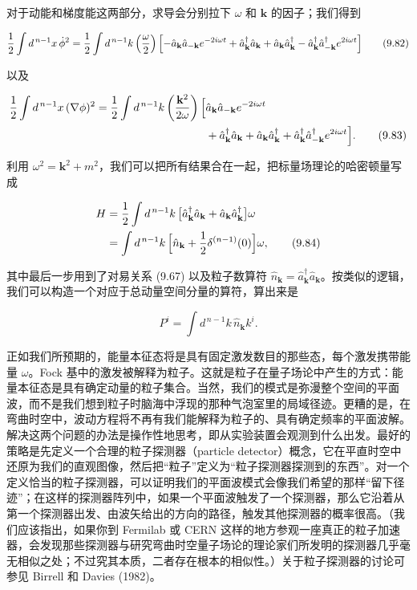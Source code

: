 对于动能和梯度能这两部分，求导会分别拉下 $\omega$ 和 $\mathbf{k}$ 的因子；我们得到

\begin{equation*}
\frac{1}{2}\int d^{\,n-1}x\,\dot{\phi}^2 = \frac{1}{2}\int d^{\,n-1}k\left(\frac{\omega}{2}\right)\Bigl[-\hat{a}_{\mathbf{k}}\hat{a}_{-\mathbf{k}}e^{-2i\omega t} + \hat{a}^{\dagger}_{\mathbf{k}}\hat{a}_{\mathbf{k}} + \hat{a}_{\mathbf{k}}\hat{a}^{\dagger}_{\mathbf{k}} - \hat{a}^{\dagger}_{\mathbf{k}}\hat{a}^{\dagger}_{-\mathbf{k}}e^{2i\omega t}\Bigr]
\tag{9.82}
\end{equation*}

以及

\begin{align*}
\frac{1}{2}\int d^{\,n-1}x\,(\nabla\phi)^2 = \frac{1}{2}\int d^{\,n-1}k\left(\frac{\mathbf{k}^2}{2\omega}\right)\Bigl[&\hat{a}_{\mathbf{k}}\hat{a}_{-\mathbf{k}}e^{-2i\omega t} \\
&+ \hat{a}^{\dagger}_{\mathbf{k}}\hat{a}_{\mathbf{k}} + \hat{a}_{\mathbf{k}}\hat{a}^{\dagger}_{\mathbf{k}} + \hat{a}^{\dagger}_{\mathbf{k}}\hat{a}^{\dagger}_{-\mathbf{k}}e^{2i\omega t}\Bigr].
\tag{9.83}
\end{align*}

利用 $\omega^2 = \mathbf{k}^2 + m^2$，我们可以把所有结果合在一起，把标量场理论的哈密顿量写成

\begin{align*}
H &= \frac{1}{2}\int d^{\,n-1}k\,\bigl[\hat{a}^{\dagger}_{\mathbf{k}}\hat{a}_{\mathbf{k}} + \hat{a}_{\mathbf{k}}\hat{a}^{\dagger}_{\mathbf{k}}\bigr]\omega \\
&= \int d^{\,n-1}k\,\Bigl[\hat{n}_{\mathbf{k}} + \frac{1}{2}\delta^{(n-1)}(0)\Bigr]\omega,
\tag{9.84}
\end{align*}

其中最后一步用到了对易关系 (9.67) 以及粒子数算符 $\hat{n}_{\mathbf{k}} = \hat{a}^{\dagger}_{\mathbf{k}}\hat{a}_{\mathbf{k}}$。按类似的逻辑，我们可以构造一个对应于总动量空间分量的算符，算出来是

\begin{equation*}
P^i = \int d^{\,n-1}k\,\hat{n}_{\mathbf{k}}k^i.
\tag{9.85}
\end{equation*}

正如我们所预期的，能量本征态将是具有固定激发数目的那些态，每个激发携带能量 $\omega$。Fock 基中的激发被解释为粒子。这就是粒子在量子场论中产生的方式：能量本征态是具有确定动量的粒子集合。当然，我们的模式是弥漫整个空间的平面波，而不是我们想到粒子时脑海中浮现的那种气泡室里的局域径迹。更糟的是，在弯曲时空中，波动方程将不再有我们能解释为粒子的、具有确定频率的平面波解。解决这两个问题的办法是操作性地思考，即从实验装置会观测到什么出发。最好的策略是先定义一个合理的粒子探测器（particle detector）概念，它在平直时空中还原为我们的直观图像，然后把“粒子”定义为“粒子探测器探测到的东西”。对一个定义恰当的粒子探测器，可以证明我们的平面波模式会像我们希望的那样“留下径迹”；在这样的探测器阵列中，如果一个平面波触发了一个探测器，那么它沿着从第一个探测器出发、由波矢给出的方向的路径，触发其他探测器的概率很高。（我们应该指出，如果你到 Fermilab 或 CERN 这样的地方参观一座真正的粒子加速器，会发现那些探测器与研究弯曲时空量子场论的理论家们所发明的探测器几乎毫无相似之处；不过究其本质，二者存在根本的相似性。）关于粒子探测器的讨论可参见 Birrell 和 Davies (1982)。

